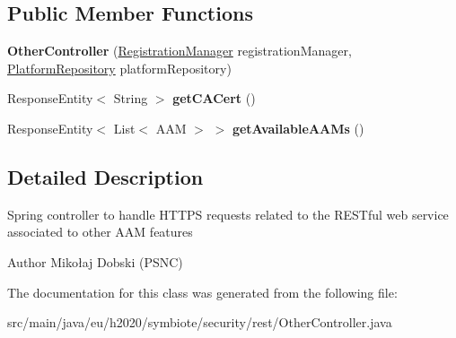 \subsection*{Public Member Functions}
\begin{DoxyCompactItemize}
\item 
{\bfseries Other\+Controller} (\hyperlink{classeu_1_1h2020_1_1symbiote_1_1security_1_1commons_1_1RegistrationManager}{Registration\+Manager} registration\+Manager, \hyperlink{interfaceeu_1_1h2020_1_1symbiote_1_1security_1_1repositories_1_1PlatformRepository}{Platform\+Repository} platform\+Repository)\hypertarget{classeu_1_1h2020_1_1symbiote_1_1security_1_1rest_1_1OtherController_a0de56d515b98dd523cdc6a06b81f8e55}{}\label{classeu_1_1h2020_1_1symbiote_1_1security_1_1rest_1_1OtherController_a0de56d515b98dd523cdc6a06b81f8e55}

\item 
Response\+Entity$<$ String $>$ {\bfseries get\+C\+A\+Cert} ()\hypertarget{classeu_1_1h2020_1_1symbiote_1_1security_1_1rest_1_1OtherController_a124bf65edc033dfebfc58aa757ca2006}{}\label{classeu_1_1h2020_1_1symbiote_1_1security_1_1rest_1_1OtherController_a124bf65edc033dfebfc58aa757ca2006}

\item 
Response\+Entity$<$ List$<$ A\+AM $>$ $>$ {\bfseries get\+Available\+A\+A\+Ms} ()\hypertarget{classeu_1_1h2020_1_1symbiote_1_1security_1_1rest_1_1OtherController_a9b4861233b76f586ad3c45dd92c045ba}{}\label{classeu_1_1h2020_1_1symbiote_1_1security_1_1rest_1_1OtherController_a9b4861233b76f586ad3c45dd92c045ba}

\end{DoxyCompactItemize}


\subsection{Detailed Description}
Spring controller to handle H\+T\+T\+PS requests related to the R\+E\+S\+Tful web service associated to other A\+AM features

\begin{DoxyAuthor}{Author}
Mikołaj Dobski (P\+S\+NC) 
\end{DoxyAuthor}


The documentation for this class was generated from the following file\+:\begin{DoxyCompactItemize}
\item 
src/main/java/eu/h2020/symbiote/security/rest/Other\+Controller.\+java\end{DoxyCompactItemize}
